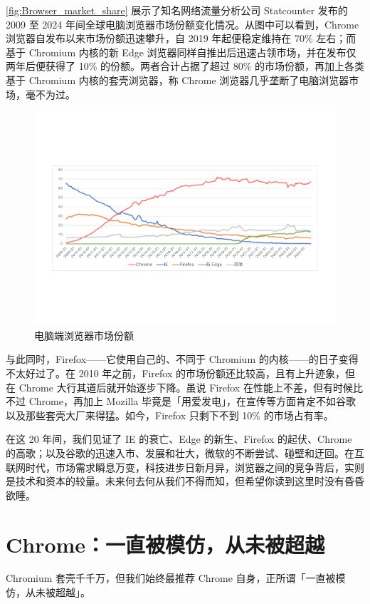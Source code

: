 \autoref{fig:Browser_market_share} 展示了知名网络流量分析公司 Statcounter 发布的 2009 至 2024 年间全球电脑浏览器市场份额变化情况。从图中可以看到，Chrome 浏览器自发布以来市场份额迅速攀升，自 2019 年起便稳定维持在 70\% 左右；而基于 Chromium 内核的新 Edge 浏览器同样自推出后迅速占领市场，并在发布仅两年后便获得了 10\% 的份额。两者合计占据了超过 80\% 的市场份额，再加上各类基于 Chromium 内核的套壳浏览器，称 Chrome 浏览器几乎垄断了电脑浏览器市场，毫不为过。

\begin{figure}[htb!]
  \centering
  \includegraphics[width=.8\textwidth]{assets/software/Browser_market_share.pdf}
  \caption{电脑端浏览器市场份额}
  \label{fig:Browser_market_share}
\end{figure}

与此同时，Firefox——它使用自己的、不同于 Chromium 的内核——的日子变得不太好过了。在 2010 年之前，Firefox 的市场份额还比较高，且有上升迹象，但在 Chrome 大行其道后就开始逐步下降。虽说 Firefox 在性能上不差，但有时候比不过 Chrome，再加上 Mozilla 毕竟是「用爱发电」，在宣传等方面肯定不如谷歌以及那些套壳大厂来得猛。如今，Firefox 只剩下不到 10\% 的市场占有率。

在这 20 年间，我们见证了 IE 的衰亡、Edge 的新生、Firefox 的起伏、Chrome 的高歌；以及谷歌的迅速入市、发展和壮大，微软的不断尝试、碰壁和迂回。在互联网时代，市场需求瞬息万变，科技进步日新月异，浏览器之间的竞争背后，实则是技术和资本的较量。未来何去何从我们不得而知，但希望你读到这里时没有昏昏欲睡。

\section{Chrome：一直被模仿，从未被超越}

Chromium 套壳千千万，但我们始终最推荐 Chrome 自身，正所谓「一直被模仿，从未被超越」。

